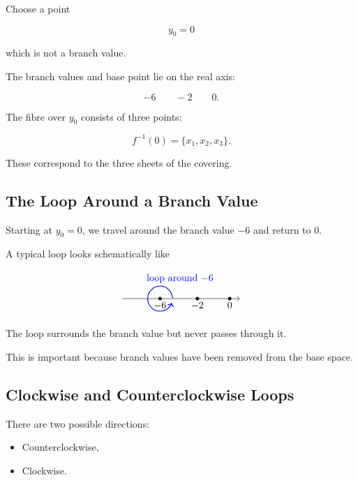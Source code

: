 \documentclass[12pt,a4paper]{article}
\theoremstyle{notespace}
\begin{document}
Choose a point

\[
y_0=0
\]

which is not a branch value.

The branch values and base point lie on the real axis:

\[
-6
\qquad
-2
\qquad
0.
\]

The fibre over \(y_0\) consists of three points:

\[
f^{-1}(0)
=
\{x_1,x_2,x_3\}.
\]

These correspond to the three sheets of the covering.

\subsection{The Loop Around a Branch Value}

Starting at \(y_0=0\), we travel around the branch value \(-6\) and
return to \(0\).

A typical loop looks schematically like

\[
\begin{tikzpicture}[scale=0.9]
	
	\draw[->] (-3.5,0) -- (1.2,0);
	
	\fill (-2,0) circle (2pt);
	\node[below] at (-2,0) {$-6$};
	
	\fill (-0.5,0) circle (2pt);
	\node[below] at (-0.5,0) {$-2$};
	
	\fill (0.8,0) circle (2pt);
	\node[below] at (0.8,0) {$0$};
	
	\draw[thick,blue,->]
	(-1.5,0)
	arc (0:340:0.5);
	
	\node[blue] at (-1.2,0.8)
	{loop around $-6$};
	
\end{tikzpicture}
\]

The loop surrounds the branch value but never passes through it.

This is important because branch values have been removed from the base
space.

\subsection{Clockwise and Counterclockwise Loops}

There are two possible directions:

\begin{itemize}
	\item Counterclockwise,
	\item Clockwise.
\end{itemize}
\end{document}
